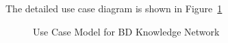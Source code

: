 \documentclass{scrreprt}
\begin{document}
The detailed use case diagram is shown in Figure~\ref{UC}
\begin{figure}
\begin{center}
\end{center} 
\caption{Use Case Model for BD Knowledge Network\label{UC}}
\end{figure}
\end{document}
